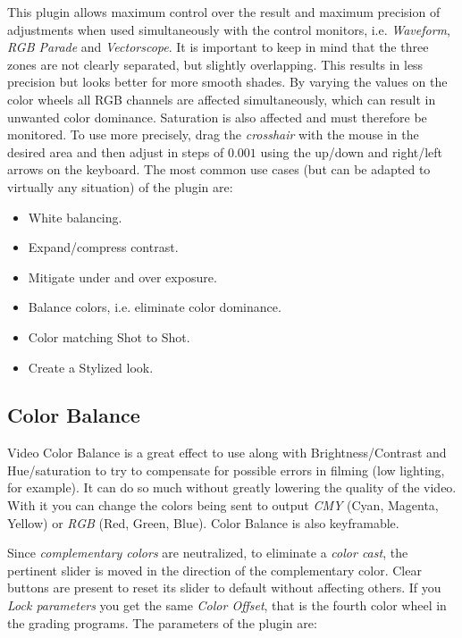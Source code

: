 This plugin allows maximum control over the result and maximum precision of adjustments when used simultaneously with the control monitors, i.e. \textit{Waveform}, \textit{RGB Parade} and \textit{Vectorscope}. It is important to keep in mind that the three zones are not clearly separated, but slightly overlapping. This results in less precision but looks better for more smooth shades. By varying the values on the color wheels all RGB channels are affected simultaneously, which can result in unwanted color dominance. Saturation is also affected and must therefore be monitored.
To use more precisely, drag the \textit{crosshair} with the mouse in the desired area and then adjust in steps of $0.001$ using the up/down and right/left arrows on the keyboard.
The most common use cases (but can be adapted to virtually any situation) of the plugin are:

\begin{itemize}
    \item White balancing.
    \item Expand/compress contrast.
    \item Mitigate under and over exposure.
    \item Balance colors, i.e. eliminate color dominance.
    \item Color matching Shot to Shot.
    \item Create a Stylized look.
\end{itemize}

\subsection{Color Balance}%
\label{sub:color_balance}

Video Color Balance is a great effect to use along with Brightness/Contrast and Hue/saturation to try to compensate for possible errors in filming (low lighting, for example). It can do so much without greatly lowering the quality of the video. With it you can change the colors being sent to output \textit{CMY} (Cyan, Magenta, Yellow) or \textit{RGB} (Red, Green, Blue). Color Balance is also keyframable.

Since \textit{complementary colors} are neutralized, to eliminate a \textit{color cast}, the pertinent slider is moved in the direction of the complementary color. Clear buttons are present to reset its slider to default without affecting others. If you \textit{Lock parameters} you get the same \textit{Color Offset}, that is the fourth color wheel in the grading programs. The parameters of the plugin are:

